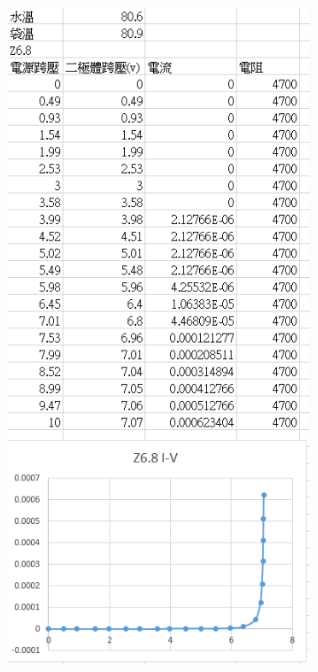\documentclass[UTF8]{ctexart}
\begin{document}
\begin{CJK*}{UTF8}{song}
\begin{minipage}[t]{0.48\textwidth}
\includegraphics[width = 0.6\textwidth]{80z68.png}
\end{minipage}
\newpage


\end{CJK*}
\end{document}
